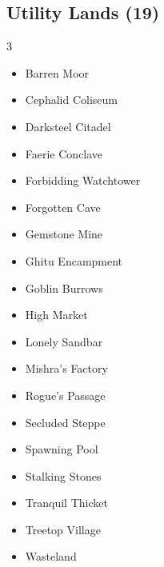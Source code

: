 \documentclass[11pt]{article}
\begin{document}
\subsection*{Utility Lands (19)}
\begin{multicols}{3}
\footnotesize
\begin{itemize}[leftmargin=1em,itemsep=0pt,parsep=0pt]
\item Barren Moor
\item Cephalid Coliseum
\item Darksteel Citadel
\item Faerie Conclave
\item Forbidding Watchtower
\item Forgotten Cave
\item Gemstone Mine
\item Ghitu Encampment
\item Goblin Burrows
\item High Market
\item Lonely Sandbar
\item Mishra's Factory
\item Rogue's Passage
\item Secluded Steppe
\item Spawning Pool
\item Stalking Stones
\item Tranquil Thicket
\item Treetop Village
\item Wasteland
\end{itemize}
\end{multicols}
\end{document}
